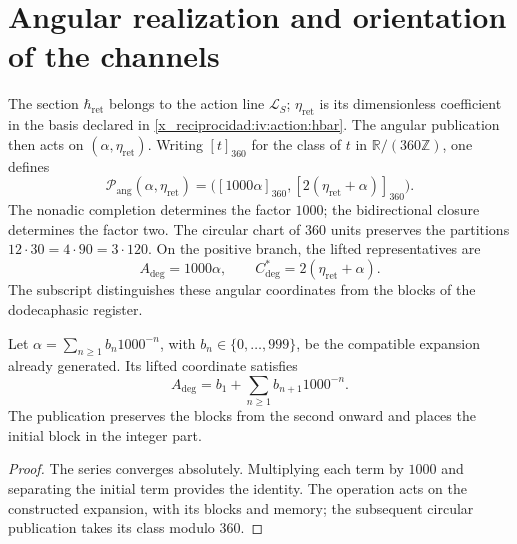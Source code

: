 \section{Angular realization and orientation of the channels}
\label{x_reciprocidad:iv:angular:section}

The section \(\hbar_{\mathrm{ret}}\) belongs to the action
line \(\mathcal L_S\); \(\eta_{\mathrm{ret}}\) is its
dimensionless coefficient in the basis declared in
\eqref{x_reciprocidad:iv:action:hbar}. The angular publication then acts
on \((\alpha,\eta_{\mathrm{ret}})\). Writing
\([t]_{360}\) for the class of \(t\) in
\(\mathbb R/(360\mathbb Z)\), one defines
\begin{equation}
 \mathcal P_{\mathrm{ang}}(\alpha,\eta_{\mathrm{ret}})
 =\bigl([1000\alpha]_{360},
        [2(\eta_{\mathrm{ret}}+\alpha)]_{360}\bigr).
 \label{x_reciprocidad:iv:angular:publicacion}
\end{equation}
The nonadic completion determines the factor \(1000\); the
bidirectional closure determines the factor two. The circular chart
of \(360\) units preserves the partitions
\(12\cdot30=4\cdot90=3\cdot120\). On the positive branch, the
lifted representatives are
\begin{equation}
 A_{\deg}=1000\alpha,\qquad
 C^*_{\deg}=2(\eta_{\mathrm{ret}}+\alpha).
 \label{x_reciprocidad:iv:angular:representantes}
\end{equation}
The subscript distinguishes these angular coordinates from the blocks
of the dodecaphasic register.

\begin{proposition}
\label{x_reciprocidad:iv:angular:desplazamiento}
Let \(\alpha=\sum_{n\geq1}b_n1000^{-n}\), with
\(b_n\in\{0,\ldots,999\}\), be the compatible expansion
already generated. Its lifted coordinate satisfies
\[
 A_{\deg}=b_1+\sum_{n\geq1}b_{n+1}1000^{-n}.
\]
The publication preserves the blocks from the second onward and
places the initial block in the integer part.
\end{proposition}
\begin{proof}
The series converges absolutely. Multiplying each term by
\(1000\) and separating the initial term provides the identity.
The operation acts on the constructed expansion, with its
blocks and memory; the subsequent circular publication takes
its class modulo \(360\).
\end{proof}

